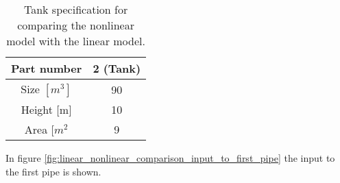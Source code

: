 \begin{table}[H]
\centering
\begin{tabular}{|c|c|}
\hline
Part number& 2 (Tank)  \\ \hline
Size $[m^3]$                                              & 90 \\ \hline
Height {[}m{]}                                             & 10 \\ \hline
Area {[}$m^2$                                              & 9  \\ \hline
\end{tabular}
\caption{Tank specification for comparing the nonlinear model with the linear model. }
\label{tab:tank_data_nonlinear_linear_test}
\end{table}




%  


%  
 


In figure \ref{fig:linear_nonlinear_comparison_input_to_first_pipe} the input to the first pipe is shown. 

